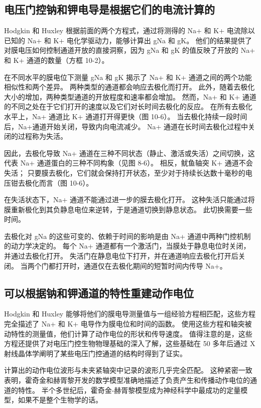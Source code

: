 \subsection{电压门控钠和钾电导是根据它们的电流计算的}
Hodgkin 和 Huxley 根据前面的两个方程式，通过将测得的 Na+ 和 K+ 电流除以已知的 Na+ 和 K+ 电化学驱动力，能够计算出 gNa 和 gK。 
他们的结果提供了对膜电压如何控制通道开放的直接洞察，因为 gNa 和 gK 的值反映了开放的 Na+ 和 K+ 通道的数量（方框 10-2）。


在不同水平的膜电位下测量 gNa 和 gK 揭示了 Na+ 和 K+ 通道之间的两个功能相似性和两个差异。 
两种类型的通道都会响应去极化而打开。 
此外，随着去极化大小的增加，两种类型通道的开放程度和速率都会增加。 
然而，Na+ 和 K+ 通道的不同之处在于它们打开的速度以及它们对长时间去极化的反应。 
在所有去极化水平上，Na+ 通道比 K+ 通道打开得更快（图 10-6）。 
当去极化持续一段时间后，Na+通道开始关闭，导致内向电流减少。 
Na+ 通道在长时间去极化过程中关闭的过程称为失活。


因此，去极化导致 Na+ 通道在三种不同状态（静止、激活或失活）之间切换，这代表 Na+ 通道蛋白的三种不同构象（见图 8-6）。 
相反，鱿鱼轴突 K+ 通道不会失活； 只要膜去极化，它们就会保持打开状态，至少对于持续长达数十毫秒的电压钳去极化而言（图 10-6）。


在失活状态下，Na+ 通道不能通过进一步的膜去极化打开。 
这种失活只能通过将膜重新极化到其负静息电位来逆转，于是通道切换到静息状态。 
此切换需要一些时间。


去极化对 gNa 的这些可变的、依赖于时间的影响是由 Na+ 通道中两种门控机制的动力学决定的。 
每个 Na+ 通道都有一个激活门，当膜处于静息电位时关闭，并通过去极化打开。 
失活门在静息电位下打开，并在通道响应去极化打开后关闭。 
当两个门都打开时，通道仅在去极化期间的短暂时间内传导 Na+。



\subsection{可以根据钠和钾通道的特性重建动作电位}

Hodgkin 和 Huxley 能够将他们的膜电导测量值与一组经验方程相匹配，这些方程完全描述了 Na+ 和 K+ 电导作为膜电位和时间的函数。 
使用这些方程和轴突被动特性的测量值，他们计算了动作电位的形状和传导速度。 
值得注意的是，这些方程还提供了对电压门控生物物理基础的深入了解，这些基础在 50 多年后通过 X 射线晶体学阐明了某些电压门控通道的结构时得到了证实。


计算出的动作电位波形与未夹紧轴突中记录的波形几乎完全匹配。 
这种紧密一致表明，霍奇金和赫胥黎开发的数学模型准确地描述了负责产生和传播动作电位的通道的特性。 
半个多世纪后，霍奇金-赫胥黎模型成为神经科学中最成功的定量模型，如果不是整个生物学的话。


